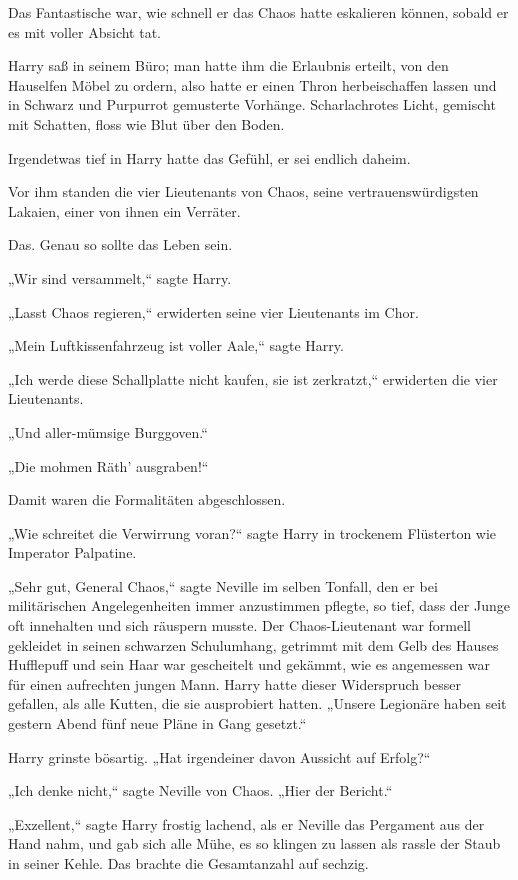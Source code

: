{\later

Das Fantastische war, wie schnell er das Chaos hatte eskalieren können, sobald er es mit voller Absicht tat.

Harry saß in seinem Büro; man hatte ihm die Erlaubnis erteilt, von den Hauselfen Möbel zu ordern, also hatte er einen Thron herbeischaffen lassen und in Schwarz und Purpurrot gemusterte Vorhänge. Scharlachrotes Licht, gemischt mit Schatten, floss wie Blut über den Boden.

Irgendetwas tief in Harry hatte das Gefühl, er sei endlich daheim.

Vor ihm standen die vier Lieutenants von Chaos, seine vertrauenswürdigsten Lakaien, einer von ihnen ein Verräter.

Das. Genau so sollte das Leben sein.

„Wir sind versammelt,“ sagte Harry.

„Lasst Chaos regieren,“ erwiderten seine vier Lieutenants im Chor.

„Mein Luftkissenfahrzeug ist voller Aale,“ sagte Harry.

„Ich werde diese Schallplatte nicht kaufen, sie ist zerkratzt,“ erwiderten die vier Lieutenants.

„Und aller-mümsige Burggoven.“

„Die mohmen Räth' ausgraben!“

Damit waren die Formalitäten abgeschlossen.

„Wie schreitet die Verwirrung voran?“ sagte Harry in trockenem Flüsterton wie Imperator Palpatine.

„Sehr gut, General Chaos,“ sagte Neville im selben Tonfall, den er bei militärischen Angelegenheiten immer anzustimmen pflegte, so tief, dass der Junge oft innehalten und sich räuspern musste. Der Chaos-Lieutenant war formell gekleidet in seinen schwarzen Schulumhang, getrimmt mit dem Gelb des Hauses Hufflepuff und sein Haar war gescheitelt und gekämmt, wie es angemessen war für einen aufrechten jungen Mann. Harry hatte dieser Widerspruch besser gefallen, als alle Kutten, die sie ausprobiert hatten. „Unsere Legionäre haben seit gestern Abend fünf neue Pläne in Gang gesetzt.“

Harry grinste bösartig. „Hat irgendeiner davon Aussicht auf Erfolg?“

„Ich denke nicht,“ sagte Neville von Chaos. „Hier der Bericht.“

„Exzellent,“ sagte Harry frostig lachend, als er Neville das Pergament aus der Hand nahm, und gab sich alle Mühe, es so klingen zu lassen als rassle der Staub in seiner Kehle. Das brachte die Gesamtanzahl auf sechzig.

}
